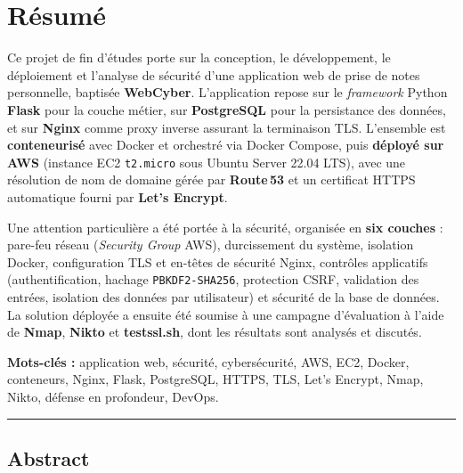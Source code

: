\chapter*{Résumé}
\thispagestyle{empty}

Ce projet de fin d'études porte sur la conception, le développement,
le déploiement et l'analyse de sécurité d'une application web de prise
de notes personnelle, baptisée \textbf{WebCyber}. L'application repose
sur le \emph{framework} Python \textbf{Flask} pour la couche métier,
sur \textbf{PostgreSQL} pour la persistance des données, et sur
\textbf{Nginx} comme proxy inverse assurant la terminaison TLS.
L'ensemble est \textbf{conteneurisé} avec Docker et orchestré via Docker
Compose, puis \textbf{déployé sur AWS} (instance EC2 \texttt{t2.micro}
sous Ubuntu Server 22.04 LTS), avec une résolution de nom de domaine
gérée par \textbf{Route\,53} et un certificat HTTPS automatique fourni
par \textbf{Let's Encrypt}.

\vspace{0.4em}

Une attention particulière a été portée à la sécurité, organisée
en \textbf{six couches} : pare-feu réseau (\emph{Security Group} AWS),
durcissement du système, isolation Docker, configuration TLS et
en-têtes de sécurité Nginx, contrôles applicatifs (authentification,
hachage \texttt{PBKDF2-SHA256}, protection CSRF, validation des
entrées, isolation des données par utilisateur) et sécurité de la
base de données. La solution déployée a ensuite été soumise à une
campagne d'évaluation à l'aide de \textbf{Nmap}, \textbf{Nikto} et
\textbf{testssl.sh}, dont les résultats sont analysés et discutés.

\vspace{0.4em}

\textbf{Mots-clés :} application web, sécurité, cybersécurité, AWS,
EC2, Docker, conteneurs, Nginx, Flask, PostgreSQL, HTTPS, TLS,
Let's Encrypt, Nmap, Nikto, défense en profondeur, DevOps.

\vspace{1.5em}

\begin{center}
\noindent\rule{0.6\linewidth}{0.4pt}
\end{center}

\vspace{0.8em}

\section*{Abstract}

